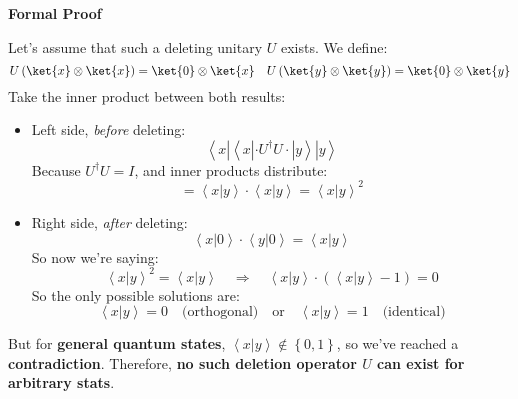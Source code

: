 \highspace
\begin{flushleft}
    \textcolor{Green3}{ \textbf{Formal Proof}}
\end{flushleft}
Let's assume that such a deleting unitary $U$ exists. We define:
\begin{equation*}
    U\left(\ket{x} \otimes \ket{x}\right) = \ket{0} \otimes \ket{x} \quad U\left(\ket{y} \otimes \ket{y}\right) = \ket{0} \otimes \ket{y}
\end{equation*}
Take the inner product between both results:
\begin{itemize}
    \item Left side, \emph{before} deleting:
    \begin{equation*}
        \left\langle x | \left\langle x | \cdot U^{\dagger}U \cdot | y \right\rangle | y \right\rangle
    \end{equation*}
    Because $U^{\dagger} U = I$, and inner products distribute:
    \begin{equation*}
        = \left\langle x | y \right\rangle \cdot \left\langle x | y \right\rangle = \left\langle x | y \right\rangle^{2}
    \end{equation*}

    \item Right side, \emph{after} deleting:
    \begin{equation*}
        \left\langle x | 0 \right\rangle \cdot \left\langle y | 0 \right\rangle = \left\langle x | y \right\rangle
    \end{equation*}
    So now we're saying:
    \begin{equation*}
        \left\langle x | y \right\rangle^{2} = \left\langle x | y \right\rangle \quad \Rightarrow \quad \left\langle x | y \right\rangle \cdot \left(\left\langle x | y \right\rangle - 1\right) = 0
    \end{equation*}
    So the only possible solutions are:
    \begin{equation*}
        \left\langle x | y \right\rangle = 0 \quad \text{(orthogonal)} \quad \text{or} \quad \left\langle x | y \right\rangle = 1 \quad \text{(identical)}
    \end{equation*}
\end{itemize}
But for \textbf{general quantum states}, $\left\langle x | y \right\rangle \notin \left\{0,1\right\}$, so we've reached a \textbf{contradiction}. Therefore, \textbf{no such deletion operator $U$ can exist for arbitrary stats}.

